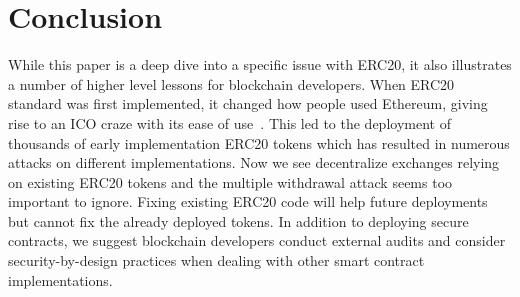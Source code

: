 
\section{Conclusion}

While this paper is a deep dive into a specific issue with ERC20, it also illustrates a number of higher level lessons for blockchain developers. When ERC20 standard was first implemented, it changed how people used Ethereum, giving rise to an ICO craze with its ease of use~\cite{fenu2018ico}. This led to the deployment of thousands of early implementation ERC20 tokens which has resulted in numerous attacks on different implementations. Now we see decentralize exchanges relying on existing ERC20 tokens and the multiple withdrawal attack seems too important to ignore. Fixing existing ERC20 code will help future deployments but cannot fix the already deployed tokens. In addition to deploying secure contracts, we suggest blockchain developers conduct external audits and consider security-by-design practices when dealing with other smart contract implementations. 



